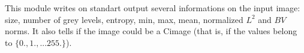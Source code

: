 This module writes on standart output several informations on the
input image: size, number of grey levels, entropy, min, max, mean,
normalized $L^2$ and $BV$ norms. It also tells if the image could be
a Cimage (that is, if the values belong to $\{0.,1.,...255.\}$).
